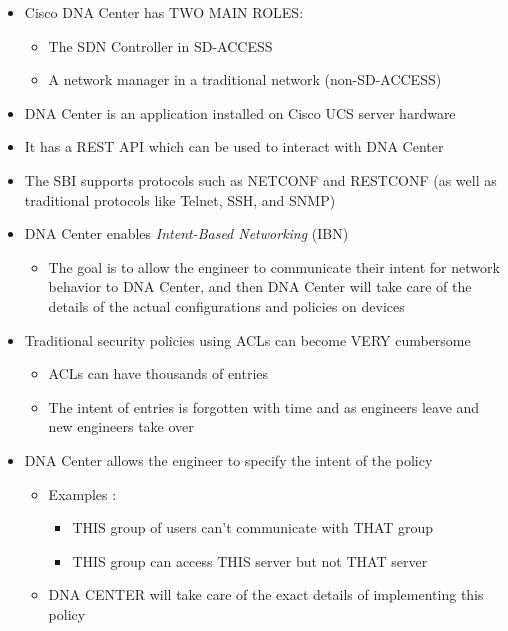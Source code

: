 \begin{itemize}
\tightlist
\item
  Cisco DNA Center has TWO MAIN ROLES:

  \begin{itemize}
  \tightlist
  \item
    The SDN Controller in SD-ACCESS
  \item
    A network manager in a traditional network (non-SD-ACCESS)
  \end{itemize}
\item
  DNA Center is an application installed on Cisco UCS server hardware
\item
  It has a REST API which can be used to interact with DNA Center
\item
  The SBI supports protocols such as NETCONF and RESTCONF (as well as
  traditional protocols like Telnet, SSH, and SNMP)
\item
  DNA Center enables \emph{Intent-Based Networking} (IBN)

  \begin{itemize}
  \tightlist
  \item
    The goal is to allow the engineer to communicate their intent for
    network behavior to DNA Center, and then DNA Center will take care
    of the details of the actual configurations and policies on devices
  \end{itemize}
\item
  Traditional security policies using ACLs can become VERY cumbersome

  \begin{itemize}
  \tightlist
  \item
    ACLs can have thousands of entries
  \item
    The intent of entries is forgotten with time and as engineers leave
    and new engineers take over
  \end{itemize}
\item
  DNA Center allows the engineer to specify the intent of the policy

  \begin{itemize}
  \tightlist
  \item
    Examples :

    \begin{itemize}
    \tightlist
    \item
      THIS group of users can't communicate with THAT group
    \item
      THIS group can access THIS server but not THAT server
    \end{itemize}
  \item
    DNA CENTER will take care of the exact details of implementing this
    policy
  \end{itemize}
\end{itemize}


